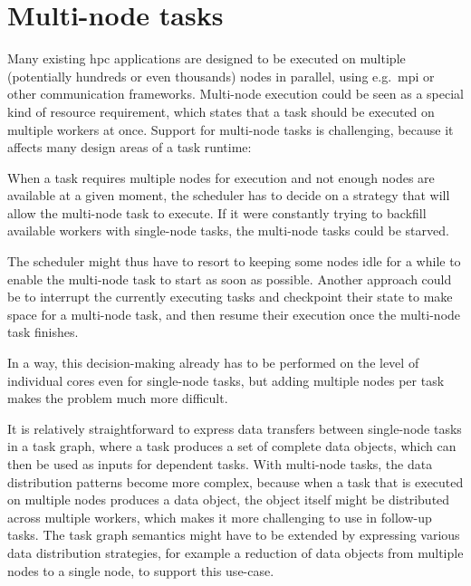 \section{Multi-node tasks}
\label{sec:multinode-tasks}
Many existing \gls{hpc} applications are designed to be executed on multiple
(potentially hundreds or even thousands) nodes in parallel, using e.g.\ \gls{mpi} or
other communication frameworks. Multi-node execution could be seen as a special kind of resource
requirement, which states that a task should be executed on multiple workers at once. Support for
multi-node tasks is challenging, because it affects many design areas of a task runtime:
\begin{description}[wide=0pt]
	\item[Scheduling] When a task requires multiple nodes for execution and not enough nodes are available at a given
		moment, the scheduler has to decide on a strategy that will allow the multi-node task to execute.
		If it were constantly trying to backfill available workers with single-node tasks, the multi-node
		tasks could be starved.

		The scheduler might thus have to resort to keeping some nodes idle for a while to enable the
		multi-node task to start as soon as possible. Another approach could be to interrupt the currently
		executing tasks and checkpoint their state to make space for a multi-node task, and then resume
		their execution once the multi-node task finishes.

		In a way, this decision-making already has to be performed on the level of individual cores even
		for single-node tasks, but adding multiple nodes per task makes the problem much more difficult.
	\item[Data transfers] It is relatively straightforward to express data transfers between single-node tasks in a task
		graph, where a task produces a set of complete data objects, which can then be used as inputs for
		dependent tasks. With multi-node tasks, the data distribution patterns become more complex, because
		when a task that is executed on multiple nodes produces a data object, the object itself might be
		distributed across multiple workers, which makes it more challenging to use in follow-up tasks. The
		task graph semantics might have to be extended by expressing various data distribution strategies,
		for example a reduction of data objects from multiple nodes to a single node, to support this
		use-case.


\end{description}
